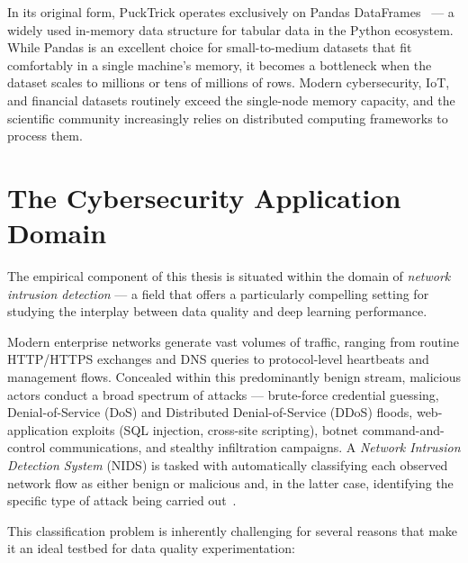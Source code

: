 In its original form, PuckTrick operates exclusively on Pandas
DataFrames~\cite{mckinney2010data} — a widely used in-memory data structure for
tabular data in the Python ecosystem.  While Pandas is an excellent choice for
small-to-medium datasets that fit comfortably in a single machine's memory, it
becomes a bottleneck when the dataset scales to millions or tens of millions of
rows.  Modern cybersecurity, IoT, and financial datasets routinely exceed the
single-node memory capacity, and the scientific community increasingly relies on
distributed computing frameworks to process them.

\section{The Cybersecurity Application Domain}
\label{sec:cybersecurity-domain}

The empirical component of this thesis is situated within the domain of
\emph{network intrusion detection} — a field that offers a particularly
compelling setting for studying the interplay between data quality and deep
learning performance.

Modern enterprise networks generate vast volumes of traffic, ranging from
routine HTTP/HTTPS exchanges and DNS queries to protocol-level heartbeats and
management flows.  Concealed within this predominantly benign stream, malicious
actors conduct a broad spectrum of attacks — brute-force credential guessing,
Denial-of-Service (DoS) and Distributed Denial-of-Service (DDoS) floods,
web-application exploits (SQL injection, cross-site scripting), botnet
command-and-control communications, and stealthy infiltration campaigns.
A \emph{Network Intrusion Detection System} (NIDS) is tasked with
automatically classifying each observed network flow as either benign or
malicious and, in the latter case, identifying the specific type of attack
being carried out~\cite{aldweesh2020deep}.

This classification problem is inherently challenging for several reasons that
make it an ideal testbed for data quality experimentation:

